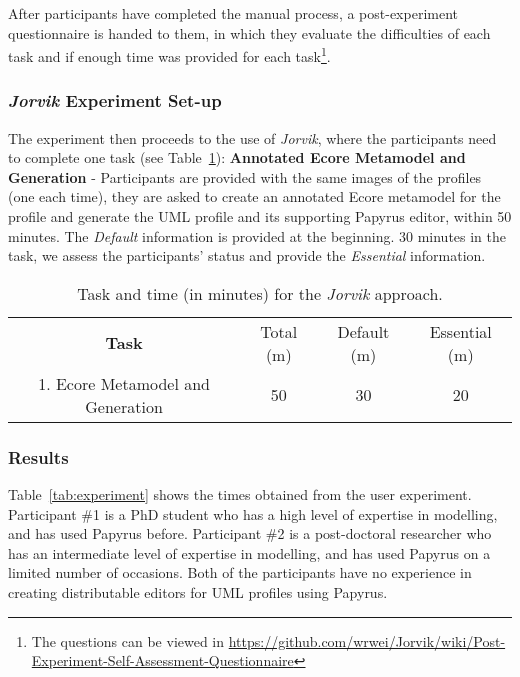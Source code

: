 After participants have completed the manual process, a post-experiment questionnaire is handed to them, in which they evaluate the difficulties of each task and if enough time was provided for each task\footnote{The questions can be viewed in \url{https://github.com/wrwei/Jorvik/wiki/Post-Experiment-Self-Assessment-Questionnaire}}.

\subsubsection{\textit{Jorvik} Experiment Set-up}
The experiment then proceeds to the use of \textit{Jorvik}, where the participants need to complete one task (see Table~\ref{tab:automatic}):
\textbf{Annotated Ecore Metamodel and Generation} - Participants are provided with the same images of the profiles (one each time), they are asked to create an annotated Ecore metamodel for the profile and generate the UML profile and its supporting Papyrus editor, within 50 minutes.
	The \textit{Default} information is provided at the beginning. 
	30 minutes in the task, we assess the participants' status and provide the \textit{Essential} information.
\begin{table}[ht!]
	\centering
	\setlength{\tabcolsep}{3.5pt} 
	\caption{Task and time (in minutes) for the \textit{Jorvik} approach.}
	\begin{tabular}{|c|c|c|c|}
		\cline{1-4}
		\textbf{Task} & Total (m) & Default (m) & Essential (m) \\ 
		1. Ecore Metamodel and Generation & 50 & 30 & 20 \\ \hline
	\end{tabular}
	\label{tab:automatic}
\end{table}


\subsubsection{Results}
Table~\ref{tab:experiment} shows the times obtained from the user experiment.
Participant \#1 is a PhD student who has a high level of expertise in modelling, and has used Papyrus before.
Participant \#2 is a post-doctoral researcher who has an intermediate level of expertise in modelling, and has used Papyrus on a limited number of occasions. 
Both of the participants have no experience in creating distributable editors for UML profiles using Papyrus.

